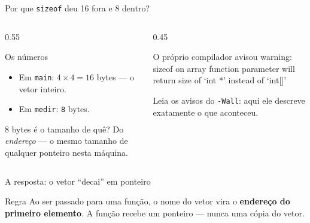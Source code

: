 \documentclass[aspectratio=169]{beamer}
\begin{document}
\begin{frame}{Por que \texttt{sizeof} deu 16 fora e 8 dentro?}
  \begin{columns}[T]
    \begin{column}{0.55\textwidth}
      \begin{block}{Os números}
        \begin{itemize}
          \item Em \texttt{main}: $4 \times 4 = 16$ bytes --- o vetor inteiro.
          \item Em \texttt{medir}: \texttt{8} bytes.
        \end{itemize}
      \end{block}
      \begin{alertblock}{8 bytes é o tamanho de quê?}
        Do \emph{endereço} --- o mesmo tamanho de qualquer ponteiro nesta
        máquina.
      \end{alertblock}
    \end{column}
    \begin{column}{0.45\textwidth}
      \begin{block}{O próprio compilador avisou}
        \scriptsize\ttfamily
        warning: sizeof on array function parameter will return size of
        `int *' instead of `int[]'
      \end{block}
      \small Leia os avisos do \texttt{-Wall}: aqui ele descreve exatamente o
      que aconteceu.
    \end{column}
  \end{columns}
\end{frame}

\begin{frame}{A resposta: o vetor ``decai'' em ponteiro}
  \begin{center}
  \end{center}
  \begin{block}{Regra}
    Ao ser passado para uma função, o nome do vetor vira o \textbf{endereço do
    primeiro elemento}. A função recebe um ponteiro --- nunca uma cópia do vetor.
  \end{block}
\end{frame}
\end{document}
